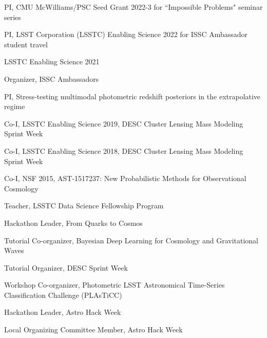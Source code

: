 \documentclass[11pt,letterpaper]{article}
\begin{document}
 \begin{list}{}{\malzlist}
 \item PI, CMU McWilliams/PSC Seed Grant 2022-3 for ``Impossible Problems" seminar series
 \item PI, LSST Corporation (LSSTC) Enabling Science 2022 for ISSC Ambassador student travel
 \item LSSTC Enabling Science 2021
\begin{list}{}{\malzlist}
	\item Organizer, ISSC Ambassadors 
	\item PI, Stress-testing multimodal photometric redshift posteriors in the extrapolative regime
\end{list}
 \item Co-I, LSSTC Enabling Science 2019, DESC Cluster Lensing Mass Modeling Sprint Week%
 \item Co-I, LSSTC Enabling Science 2018, DESC Cluster Lensing Mass Modeling Sprint Week%
\item Co-I, NSF 2015, AST-1517237: New Probabilistic Methods for Observational Cosmology
\end{list}

\nopagebreak\begin{list}{}{\malzlist}
	\item Teacher, LSSTC Data Science Fellowship Program 
	\item Hackathon Leader, From Quarks to Cosmos 
	\item Tutorial Co-organizer, Bayesian Deep Learning for Cosmology and Gravitational Waves 
	\item Tutorial Organizer, DESC Sprint Week 
	\item Workshop Co-organizer, Photometric LSST Astronomical Time-Series Classification Challenge (PLAsTiCC) 
	\item Hackathon Leader, Astro Hack Week 
	\item Local Organizing Committee Member, Astro Hack Week 
\end{list}
\end{document}
